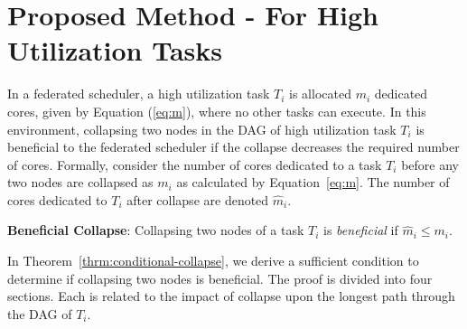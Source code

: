 \section{Proposed Method - For High Utilization Tasks}

In a federated scheduler, a high utilization task $T_i$ is allocated $m_i$ dedicated cores, given by Equation (\ref{eq:m}), where no other tasks can execute. In this environment, collapsing two nodes in the DAG of high utilization task $T_i$ is beneficial to the federated scheduler if the collapse decreases the required number of cores. Formally, consider the number of cores dedicated to a task ${T_i}$ before any two nodes are collapsed as ${m_i}$ as calculated by Equation~\ref{eq:m}. The number of cores dedicated to ${T_i}$ after collapse are denoted ${\hat{m}_i}$.

\textbf{Beneficial Collapse}: Collapsing two nodes of a task ${T_i}$ is \emph{beneficial} if ${\hat{m}_i \le m_i}$.


In Theorem~\ref{thrm:conditional-collapse}, we derive a sufficient condition to determine if collapsing two nodes is beneficial. The proof is divided into four sections. Each is related to the impact of collapse upon the longest path through the DAG of ${T_i}$.

